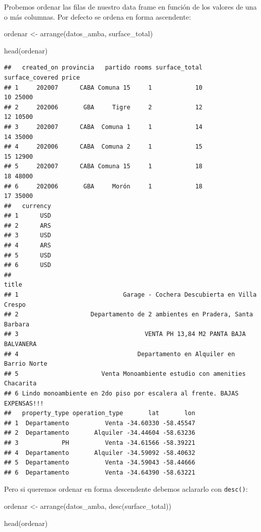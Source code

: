 \documentclass[
  spanish,
]{book}
\newenvironment{Shaded}{\begin{snugshade}}{\end{snugshade}}
\newcommand{\FunctionTok}[1]{\textcolor[rgb]{0.00,0.00,0.00}{#1}}
\newcommand{\NormalTok}[1]{#1}
\newcommand{\OtherTok}[1]{\textcolor[rgb]{0.56,0.35,0.01}{#1}}
\begin{document}
Probemos ordenar las filas de nuestro data frame en función de los valores de una o más columnas. Por defecto se ordena en forma ascendente:

\begin{Shaded}
\begin{Highlighting}[]
\NormalTok{ordenar }\OtherTok{\textless{}{-}} \FunctionTok{arrange}\NormalTok{(datos\_amba, surface\_total)}

\FunctionTok{head}\NormalTok{(ordenar)}
\end{Highlighting}
\end{Shaded}

\begin{verbatim}
##   created_on provincia   partido rooms surface_total surface_covered price
## 1     202007      CABA Comuna 15     1            10              10 25000
## 2     202006       GBA     Tigre     2            12              12 10500
## 3     202007      CABA  Comuna 1     1            14              14 35000
## 4     202006      CABA  Comuna 2     1            15              15 12900
## 5     202007      CABA Comuna 15     1            18              18 48000
## 6     202006       GBA     Morón     1            18              17 35000
##   currency
## 1      USD
## 2      ARS
## 3      USD
## 4      ARS
## 5      USD
## 6      USD
##                                                                      title
## 1                             Garage - Cochera Descubierta en Villa Crespo
## 2                    Departamento de 2 ambientes en Pradera, Santa Barbara
## 3                                   VENTA PH 13,84 M2 PANTA BAJA BALVANERA
## 4                                 Departamento en Alquiler en Barrio Norte
## 5                       Venta Monoambiente estudio con amenities Chacarita
## 6 Lindo monoambiente en 2do piso por escalera al frente. BAJAS EXPENSAS!!!
##   property_type operation_type       lat       lon
## 1  Departamento          Venta -34.60330 -58.45547
## 2  Departamento       Alquiler -34.44604 -58.63236
## 3            PH          Venta -34.61566 -58.39221
## 4  Departamento       Alquiler -34.59092 -58.40632
## 5  Departamento          Venta -34.59043 -58.44666
## 6  Departamento          Venta -34.64390 -58.63221
\end{verbatim}

Pero si queremos ordenar en forma descendente debemos aclararlo con \texttt{desc()}:

\begin{Shaded}
\begin{Highlighting}[]
\NormalTok{ordenar }\OtherTok{\textless{}{-}} \FunctionTok{arrange}\NormalTok{(datos\_amba, }\FunctionTok{desc}\NormalTok{(surface\_total))}

\FunctionTok{head}\NormalTok{(ordenar)}
\end{Highlighting}
\end{Shaded}
\end{document}
